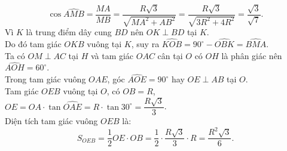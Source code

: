 \begin{bt}
{\begin{enumerate}[a)]
	$$\cos \widehat{AMB} = \dfrac{MA}{MB} = \dfrac{R\sqrt{3}}{\sqrt{MA^2 + AB^2}} = \dfrac{R\sqrt{3}}{\sqrt{3R^2 + 4R^2}} = \dfrac{\sqrt{3}}{\sqrt{7}}.$$
	Vì $K$ là trung điểm dây cung $BD$ nên $OK \perp BD$ tại $K$.\\
	Do đó tam giác $OKB$ vuông tại $K$, suy ra $\widehat{KOB} = 90^\circ - \widehat{OBK} = \widehat{BMA}$.\\
	Ta có $OM \perp AC$ tại $H$ và tam giác $OAC$ cân tại $O$ có $OH$ là phân giác nên $\widehat{AOH} = 60^\circ$.\\
	Trong tam giác vuông $OAE$, góc $\widehat{AOE} = 90^\circ$ hay $OE \perp AB$ tại $O$.\\
	Tam giác $OEB$ vuông tại $O$, có $OB = R$, $OE = OA \cdot \tan \widehat{OAE} = R \cdot \tan 30^\circ = \dfrac{R\sqrt{3}}{3}$.\\
	Diện tích tam giác vuông $OEB$ là:
	$$S_{OEB} = \dfrac{1}{2} OE \cdot OB = \dfrac{1}{2} \cdot \dfrac{R\sqrt{3}}{3} \cdot R = \dfrac{R^2\sqrt{3}}{6}.$$
\end{enumerate}
}
\end{bt}
